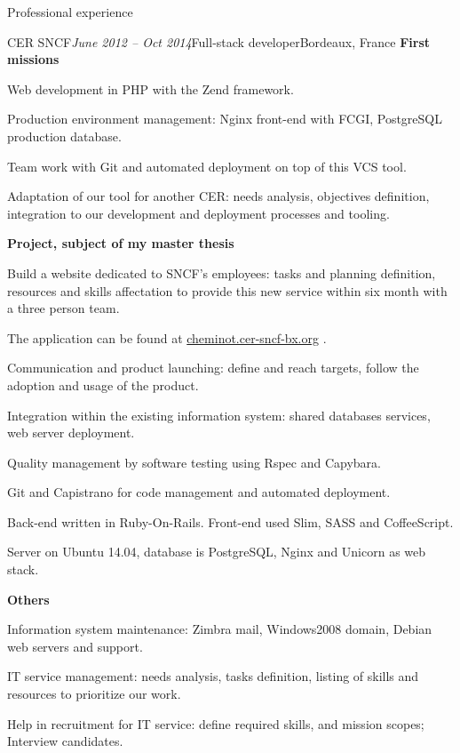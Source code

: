 \begin{rSection}{Professional experience}
\begin{rSubsection}{CER SNCF}{\em June 2012 -- Oct 2014}{Full-stack developer}{Bordeaux, France}
    \textbf{First missions}
      \item Web development in PHP with the Zend framework.
      \item Production environment management: Nginx front-end with FCGI, PostgreSQL production database.
      \item Team work with Git and automated deployment on top of this VCS tool.
      \item Adaptation of our tool for another CER: needs analysis, objectives definition, integration to our development and deployment processes and tooling.

    \textbf{Project, subject of my master thesis}
      \item Build a website dedicated to SNCF's employees: tasks and planning definition, resources and skills affectation to provide this new service within six month with a three person team.
      \item The application can be found at \href{http://cheminot.cer-sncf-bx.org}{cheminot.cer-sncf-bx.org} .
      \item Communication and product launching: define and reach targets, follow the adoption and usage of the product.
      \item Integration within the existing information system: shared databases services, web server deployment.
      \item Quality management by software testing using Rspec and Capybara.
      \item Git and Capistrano for code management and automated deployment.
      \item Back-end written in Ruby-On-Rails. Front-end used Slim, SASS and CoffeeScript.
      \item Server on Ubuntu 14.04, database is PostgreSQL, Nginx and Unicorn as web stack.

    \textbf{Others}
      \item Information system maintenance: Zimbra mail, Windows2008 domain, Debian web servers and support.
      \item IT service management: needs analysis, tasks definition, listing of skills and resources to prioritize our work.
      \item Help in recruitment for IT service: define required skills, and mission scopes; Interview candidates.

  \end{rSubsection}

\end{rSection}
